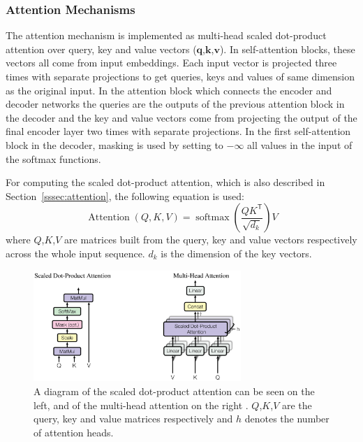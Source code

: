 \documentclass[12pt]{article}
\DeclareMathOperator{\Attention}{Attention}
\DeclareMathOperator{\softmax}{softmax}
\begin{document}
\subsubsection{Attention Mechanisms} \label{sssec:trf_attention}
The attention mechanism is implemented as multi-head scaled dot-product attention over query, key and value vectors (\(\bm{q}\),\(\bm{k}\),\(\bm{v}\)). In self-attention blocks, these vectors all come from input embeddings. Each input vector is projected three times with separate projections to get queries, keys and values of same dimension as the original input. In the attention block which connects the encoder and decoder networks the queries are the outputs of the previous attention block in the decoder and the key and value vectors come from projecting the output of the final encoder layer two times with separate projections. In the first self-attention block in the decoder, masking is used by setting to \(-\infty\) all values in the input of the softmax functions.

For computing the scaled dot-product attention, which is also described in Section~\ref{sssec:attention}, the following equation is used:
\begin{equation}
\Attention(Q,K,V)=\softmax\left(\frac{QK^\mathsf{T}}{\sqrt{d_k}}\right)V
\end{equation}
where \(Q\),\(K\),\(V\) are matrices built from the query, key and value vectors respectively across the whole input sequence. \(d_k\) is the dimension of the key vectors.

\begin{figure}[H] 
	\centering
	\includegraphics[width=0.7\textwidth]{pics/trf_attention.png}
	\caption{A diagram of the scaled dot-product attention can be seen on the left, and of the multi-head attention on the right \cite{Vaswani:2017}. \(Q\),\(K\),\(V\) are the query, key and value matrices respectively and \(h\) denotes the number of attention heads.}
	\label{fig:trf_attention}
\end{figure}
\end{document}
